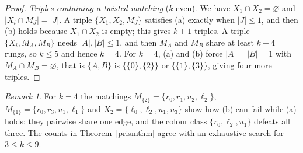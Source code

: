 \documentclass[11pt]{article}
\theoremstyle{remark}
\newtheorem*{remark}{Remark}
\begin{document}
\begin{proof}
\emph{Triples containing a twisted matching} (\(k\) even). We have
\(X_1\cap X_2=\varnothing\) and \(|X_i\cap M_J|=|J|\). A triple
\(\{X_1,X_2,M_J\}\) satisfies (a) exactly when \(|J|\le1\), and then (b)
holds because \(X_1\cap X_2\) is empty; this gives \(k+1\) triples. A triple
\(\{X_i,M_A,M_B\}\) needs \(|A|,|B|\le1\), and then \(M_A\) and \(M_B\) share
at least \(k-4\) rungs, so \(k\le5\) and hence \(k=4\). For \(k=4\), (a) and (b) force
\(|A|=|B|=1\) with \(M_A\cap M_B=\varnothing\), that is \(\{A,B\}\) is
\(\{\{0\},\{2\}\}\) or \(\{\{1\},\{3\}\}\), giving four more triples.
\end{proof}

\begin{remark}
For \(k=4\) the matchings \(M_{\{2\}}=\{r_0,r_1,u_2,\ell_2\}\),
\(M_{\{1\}}=\{r_0,r_3,u_1,\ell_1\}\) and \(X_2=\{\ell_0,\ell_2,u_1,u_3\}\)
show how (b) can fail while (a) holds: they
pairwise share one edge, and the colour class
\(\{r_0,\ell_2,u_1\}\) defeats all three. The counts in
Theorem~\ref{prismthm} agree with an exhaustive search for \(3\le k\le9\).
\end{remark}
\end{document}
